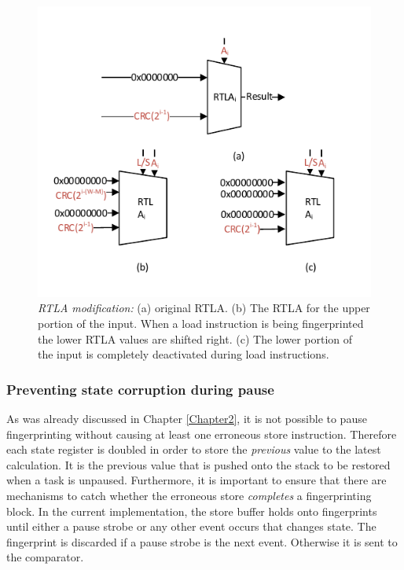 \begin{figure}[ht]
\centering
\includegraphics[scale=1]{Figures/rtla}
\caption[RTLA modification]{\emph{RTLA modification:} (a) original RTLA. (b) The RTLA for the upper portion of the input. When a load instruction is being fingerprinted the lower RTLA values are shifted right. (c) The lower portion of the input is completely deactivated during load instructions.}
\label{f:rtla}
\end{figure}

\subsubsection{Preventing state corruption during pause}
As was already discussed in Chapter \ref{Chapter2}, it is not possible to pause fingerprinting without causing at least one erroneous store instruction. Therefore each state register is doubled in order to store the \emph{previous} value to the latest calculation. It is the previous value that is pushed onto the stack to be restored when a task is unpaused. Furthermore, it is important to ensure that there are mechanisms to catch whether the erroneous store \emph{completes} a fingerprinting block. In the current implementation, the store buffer holds onto fingerprints until either a pause strobe or any other event occurs that changes state. The fingerprint is discarded if a pause strobe is the next event. Otherwise it is sent to the comparator. 

